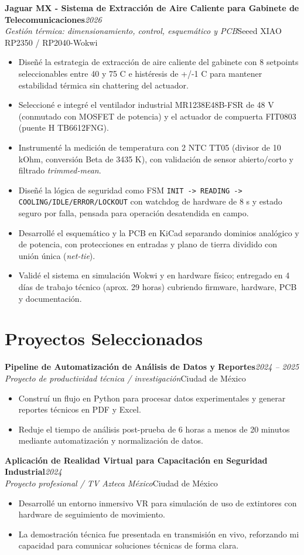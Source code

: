 \documentclass[10pt,a4paper]{article}
\newcommand{\resumeItem}[1]{\item\small #1}
\newcommand{\resumeSubheading}[4]{%
  \vspace{3pt}\noindent
  \textbf{#1}\hfill{\small\textit{\color{graytext}#2}}\\
  \textit{\color{graytext}#3}\hfill{\small\color{graytext}#4}\vspace{2pt}
}
\newcommand{\resumeItemListStart}{\begin{itemize}[leftmargin=1.15em,itemsep=1pt,topsep=2pt,partopsep=0pt,parsep=0pt]}
\newcommand{\resumeItemListEnd}{\end{itemize}\vspace{2pt}}
\begin{document}
\resumeSubheading
{Jaguar MX - Sistema de Extracci\'on de Aire Caliente para Gabinete de Telecomunicaciones}{2026}
{Gesti\'on t\'ermica: dimensionamiento, control, esquem\'atico y PCB}{Seeed XIAO RP2350 / RP2040-Wokwi}
\resumeItemListStart
  \resumeItem{Dise\~n\'e la estrategia de extracci\'on de aire caliente del gabinete con 8 setpoints seleccionables entre 40 y 75 \textdegree C e hist\'eresis de +/-1 \textdegree C para mantener estabilidad t\'ermica sin chattering del actuador.}
  \resumeItem{Seleccion\'e e integr\'e el ventilador industrial MR1238E48B-FSR de 48 V (conmutado con MOSFET de potencia) y el actuador de compuerta FIT0803 (puente H TB6612FNG).}
  \resumeItem{Instrument\'e la medici\'on de temperatura con 2 NTC TT05 (divisor de 10 kOhm, conversi\'on Beta de 3435 K), con validaci\'on de sensor abierto/corto y filtrado \emph{trimmed-mean}.}
  \resumeItem{Dise\~n\'e la l\'ogica de seguridad como FSM \texttt{INIT -> READING -> COOLING/IDLE/ERROR/LOCKOUT} con watchdog de hardware de 8 s y estado seguro por falla, pensada para operaci\'on desatendida en campo.}
  \resumeItem{Desarroll\'e el esquem\'atico y la PCB en KiCad separando dominios anal\'ogico y de potencia, con protecciones en entradas y plano de tierra dividido con uni\'on \'unica (\emph{net-tie}).}
  \resumeItem{Valid\'e el sistema en simulaci\'on Wokwi y en hardware f\'isico; entregado en 4 d\'ias de trabajo t\'ecnico (aprox. 29 horas) cubriendo firmware, hardware, PCB y documentaci\'on.}
\resumeItemListEnd

\section{Proyectos Seleccionados}

\resumeSubheading
{Pipeline de Automatizaci\'on de An\'alisis de Datos y Reportes}{2024 -- 2025}
{Proyecto de productividad t\'ecnica / investigaci\'on}{Ciudad de M\'exico}
\resumeItemListStart
  \resumeItem{Constru\'i un flujo en Python para procesar datos experimentales y generar reportes t\'ecnicos en PDF y Excel.}
  \resumeItem{Reduje el tiempo de an\'alisis post-prueba de 6 horas a menos de 20 minutos mediante automatizaci\'on y normalizaci\'on de datos.}
\resumeItemListEnd

\resumeSubheading
{Aplicaci\'on de Realidad Virtual para Capacitaci\'on en Seguridad Industrial}{2024}
{Proyecto profesional / TV Azteca M\'exico}{Ciudad de M\'exico}
\resumeItemListStart
  \resumeItem{Desarroll\'e un entorno inmersivo VR para simulaci\'on de uso de extintores con hardware de seguimiento de movimiento.}
  \resumeItem{La demostraci\'on t\'ecnica fue presentada en transmisi\'on en vivo, reforzando mi capacidad para comunicar soluciones t\'ecnicas de forma clara.}
\resumeItemListEnd
\end{document}
